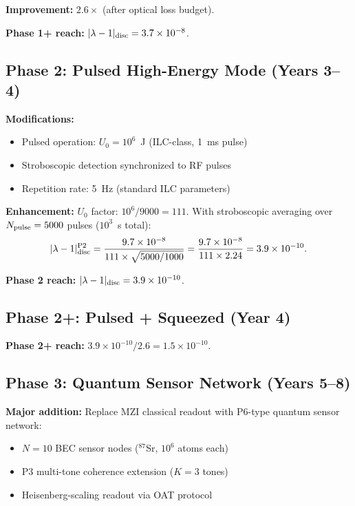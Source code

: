 \documentclass[11pt]{article}
\newcommand{\ee}[1]{\times 10^{#1}}
\newcommand{\lam}{\lambda}
\begin{document}
\textbf{Improvement:} $2.6\times$ (after optical loss budget).

\textbf{Phase 1+ reach:} $|\lam-1|_{\rm disc} = 3.7\ee{-8}$.

\subsection{Phase 2: Pulsed High-Energy Mode (Years 3--4)}

\textbf{Modifications:}
\begin{itemize}[nosep]
\item Pulsed operation: $U_0 = 10^6$~J (ILC-class, 1~ms pulse)
\item Stroboscopic detection synchronized to RF pulses
\item Repetition rate: 5~Hz (standard ILC parameters)
\end{itemize}

\textbf{Enhancement:} $U_0$ factor: $10^6/9000 = 111$.
With stroboscopic averaging over $N_{\rm pulse} = 5000$ pulses
($10^3$~s total):
\begin{equation}
|\lam-1|_{\rm disc}^{\rm P2} = \frac{9.7\ee{-8}}{111 \times \sqrt{5000/1000}}
= \frac{9.7\ee{-8}}{111 \times 2.24} = 3.9\ee{-10}.
\end{equation}

\textbf{Phase 2 reach:} $|\lam-1|_{\rm disc} = 3.9\ee{-10}$.

\subsection{Phase 2+: Pulsed + Squeezed (Year 4)}

\textbf{Phase 2+ reach:} $3.9\ee{-10}/2.6 = 1.5\ee{-10}$.

\subsection{Phase 3: Quantum Sensor Network (Years 5--8)}

\textbf{Major addition:} Replace MZI classical readout with
P6-type quantum sensor network:
\begin{itemize}[nosep]
\item $N = 10$ BEC sensor nodes ($^{87}$Sr, $10^6$ atoms each)
\item P3 multi-tone coherence extension ($K = 3$ tones)
\item Heisenberg-scaling readout via OAT protocol
\end{itemize}
\end{document}

